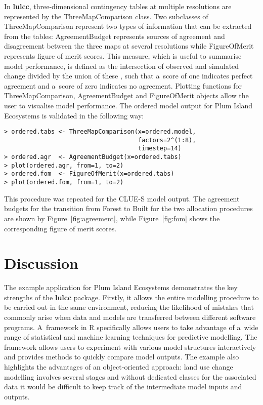 \documentclass[gmdd, online, hvmath]{copernicus}
\begin{document}
In \textbf{lulcc}, three-dimensional contingency tables at multiple resolutions are represented by the ThreeMapComparison class. Two subclasses of ThreeMapComparison represent two types of information that can be extracted from the tables: AgreementBudget represents sources of agreement and disagreement between the three maps at several resolutions while FigureOfMerit represents figure of merit scores. This measure, which is useful to summarise model performance, is defined as the intersection of observed and simulated change divided by the union of these \citep{pontius2011}, such that a~score of one indicates perfect agreement and a~score of zero indicates no agreement. Plotting functions for ThreeMapComparison, AgreementBudget and FigureOfMerit objects allow the user to visualise model performance. The ordered model output for Plum Island Ecosystems is validated in the following way:
\begin{verbatim}
> ordered.tabs <- ThreeMapComparison(x=ordered.model, 
                                     factors=2^(1:8), 
                                     timestep=14) 
> ordered.agr  <- AgreementBudget(x=ordered.tabs) 
> plot(ordered.agr, from=1, to=2) 
> ordered.fom  <- FigureOfMerit(x=ordered.tabs) 
> plot(ordered.fom, from=1, to=2) 
\end{verbatim}\hack{\noindent}This procedure was repeated for the CLUE-S model output. The agreement budgets for the transition from Forest to Built for the two allocation procedures are shown by Figure~\ref{fig:agreement}, while Figure~\ref{fig:fom} shows the corresponding figure of merit scores. \\

\section{Discussion}

The example application for Plum Island Ecosystems demonstrates the key strengths of the \textbf{lulcc} package. Firstly, it allows the entire modelling procedure to be carried out in the same environment, reducing the likelihood of mistakes that commonly arise when data and models are transferred between different software programs. A~framework in R specifically allows users to take advantage of a~wide range of statistical and machine learning techniques for predictive modelling. The framework allows users to experiment with various model structures interactively and provides methods to quickly compare model outputs. The example also highlights the advantages of an object-oriented approach: land use change modelling involves several stages and without dedicated classes for the associated data it would be difficult to keep track of the intermediate model inputs and outputs. \\
\end{document}
